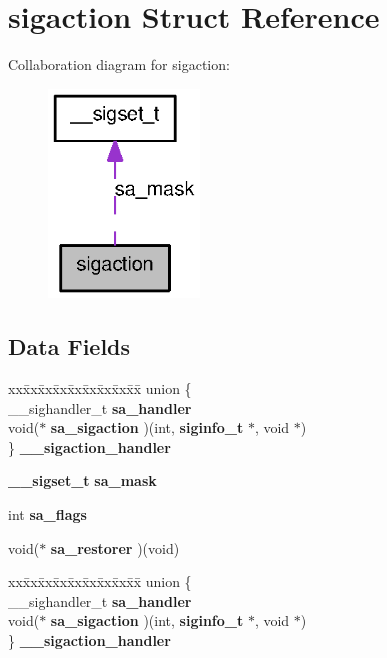 \section{sigaction Struct Reference}
\label{structsigaction}


Collaboration diagram for sigaction:
\nopagebreak
\begin{figure}[H]
\begin{center}
\leavevmode
\includegraphics[width=114pt]{structsigaction__coll__graph}
\end{center}
\end{figure}
\subsection*{Data Fields}
\begin{DoxyCompactItemize}
\item 
\begin{tabbing}
xx\=xx\=xx\=xx\=xx\=xx\=xx\=xx\=xx\=\kill
union \{\\
\>\_\_sighandler\_t {\bf sa\_handler}\\
\>void($\ast$ {\bf sa\_sigaction} )(int, {\bf siginfo\_t} $\ast$, void $\ast$)\\
\} {\bf \_\_sigaction\_handler}\\

\end{tabbing}\item 
{\bf \_\-\_\-sigset\_\-t} {\bf sa\_\-mask}
\item 
int {\bf sa\_\-flags}
\item 
void($\ast$ {\bf sa\_\-restorer} )(void)
\item 
\begin{tabbing}
xx\=xx\=xx\=xx\=xx\=xx\=xx\=xx\=xx\=\kill
union \{\\
\>\_\_sighandler\_t {\bf sa\_handler}\\
\>void($\ast$ {\bf sa\_sigaction} )(int, {\bf siginfo\_t} $\ast$, void $\ast$)\\
\} {\bf \_\_sigaction\_handler}\\

\end{tabbing}\end{DoxyCompactItemize}


